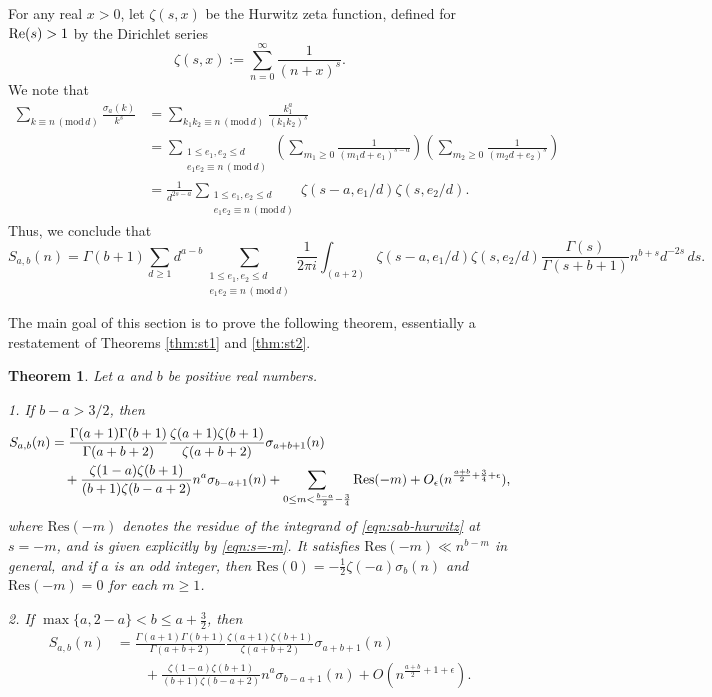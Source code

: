 \documentclass[12pt]{amsart}
\newtheorem{theorem}{Theorem}
\numberwithin{equation}{section}
\numberwithin{theorem}{section}
\renewcommand\Re{\textnormal{Re}}
\renewcommand{\pmod}[1]{\,\left(\mathrm{mod}\,#1\right)}
\begin{document}
For any real $x>0$, let $\zeta(s,x)$ be the Hurwitz zeta function, defined for $\Re(s)>1$ by the Dirichlet series
\[
	\zeta(s,x)
		:= \sum_{n=0}^\infty \frac{1}{(n+x)^s}.
\]
We note that \begin{align*}
	\sum_{k \equiv n \pmod{d}} \frac{\sigma_a(k)}{k^s}
		&= \sum_{k_1k_2 \equiv n \pmod{d}} \frac{k_1^a}{(k_1k_2)^s} \\
		&= \sum_{\substack{ 1 \leq e_1,e_2 \leq d \\ e_1 e_2 \equiv n \pmod{d}}} \left(\sum_{m_1 \geq 0} \frac{1}{(m_1d + e_1)^{s-a}} \right) \left( \sum_{m_2 \geq 0} \frac{1}{(m_2d+e_2)^s}\right) \\
		&= \frac{1}{d^{2s-a}} \sum_{\substack{ 1 \leq e_1,e_2 \leq d \\ e_1 e_2 \equiv n \pmod{d}}} \zeta(s-a, e_1/d) \zeta(s,e_2/d).
\end{align*}
Thus, we conclude that
\begin{equation} \label{eqn:sab-hurwitz}
	S_{a,b}(n)
		= \Gamma(b+1) \sum_{d \geq 1} d^{a-b} \sum_{\substack{1 \leq e_1,e_2 \leq d \\ e_1e_2 \equiv n \pmod{d}}} \frac{1}{2\pi i} \int_{(a+2)} \zeta(s-a,e_1/d) \zeta(s,e_2/d) \frac{\Gamma(s)}{\Gamma(s+b+1)}n^{b+s}d^{-2s}\,ds.
\end{equation}

The main goal of this section is to prove the following theorem, essentially a restatement of Theorems \ref{thm:st1} and \ref{thm:st2}.

\begin{theorem}\label{thm:st-hurwitz}
	Let $a$ and $b$ be positive real numbers.  

	1.  If $b-a > 3/2$, then
	\begin{align*}
		S_{a,b}(n) 
			&= \frac{\Gamma(a+1)\Gamma(b+1)}{\Gamma(a+b+2)}\frac{\zeta(a+1)\zeta(b+1)}{\zeta(a+b+2)}\sigma_{a+b+1}(n) \\ 
			\notag &\quad  + \frac{\zeta(1-a)\zeta(b+1)}{(b+1)\zeta(b-a+2)}n^a\sigma_{b-a+1}(n) 
			 + \sum_{0 \leq m < \frac{b-a}{2}-\frac{3}{4}} \mathrm{Res}(-m) + O_\epsilon(n^{\frac{a+b}{2}+\frac{3}{4}+\epsilon}),
	\end{align*}
	where $\mathrm{Res}(-m)$ denotes the residue of the integrand of \eqref{eqn:sab-hurwitz} at $s=-m$, and is given explicitly by \eqref{eqn:s=-m}.  It satisfies $\mathrm{Res}(-m) \ll n^{b-m}$ in general, and if $a$ is an odd integer, then $\mathrm{Res}(0) = -\frac{1}{2}\zeta(-a)\sigma_b(n)$ and $\mathrm{Res}(-m)=0$ for each $m \geq 1$.

	2.  If $\max\{a,2-a\} < b \leq a + \frac{3}{2}$, then
	\begin{align*}
		S_{a,b}(n) 
			&= \frac{\Gamma(a+1)\Gamma(b+1)}{\Gamma(a+b+2)}\frac{\zeta(a+1)\zeta(b+1)}{\zeta(a+b+2)}\sigma_{a+b+1}(n)  \\
			& \quad\quad + \frac{\zeta(1-a)\zeta(b+1)}{(b+1)\zeta(b-a+2)}n^a\sigma_{b-a+1}(n) + O(n^{\frac{a+b}{2}+1+\epsilon}).
	\end{align*}
\end{theorem}
\end{document}
